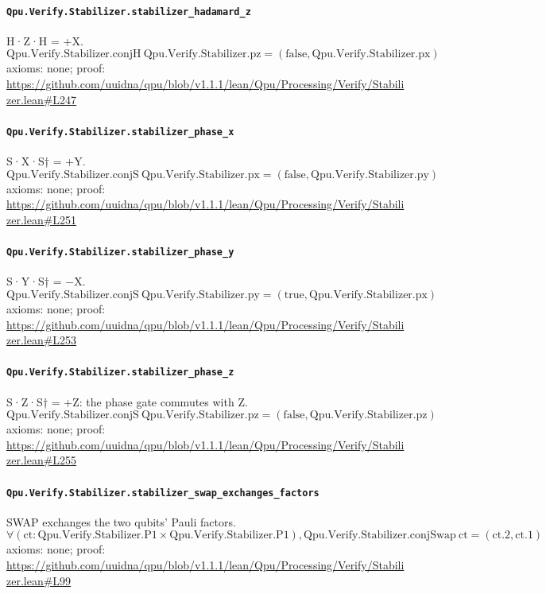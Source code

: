 \documentclass[11pt]{article}
\begin{document}
\paragraph{\texttt{Qpu.Verify.Stabilizer.stabilizer\_hadamard\_z}}
H·Z·H = +X.
\[ \mathrm{Qpu.Verify.Stabilizer.conjH}\ \mathrm{Qpu.Verify.Stabilizer.pz} = (\mathrm{false}, \mathrm{Qpu.Verify.Stabilizer.px}) \]
\noindent axioms: none; proof: \url{https://github.com/uuidna/qpu/blob/v1.1.1/lean/Qpu/Processing/Verify/Stabilizer.lean\#L247}

\paragraph{\texttt{Qpu.Verify.Stabilizer.stabilizer\_phase\_x}}
S·X·S† = +Y.
\[ \mathrm{Qpu.Verify.Stabilizer.conjS}\ \mathrm{Qpu.Verify.Stabilizer.px} = (\mathrm{false}, \mathrm{Qpu.Verify.Stabilizer.py}) \]
\noindent axioms: none; proof: \url{https://github.com/uuidna/qpu/blob/v1.1.1/lean/Qpu/Processing/Verify/Stabilizer.lean\#L251}

\paragraph{\texttt{Qpu.Verify.Stabilizer.stabilizer\_phase\_y}}
S·Y·S† = −X.
\[ \mathrm{Qpu.Verify.Stabilizer.conjS}\ \mathrm{Qpu.Verify.Stabilizer.py} = (\mathrm{true}, \mathrm{Qpu.Verify.Stabilizer.px}) \]
\noindent axioms: none; proof: \url{https://github.com/uuidna/qpu/blob/v1.1.1/lean/Qpu/Processing/Verify/Stabilizer.lean\#L253}

\paragraph{\texttt{Qpu.Verify.Stabilizer.stabilizer\_phase\_z}}
S·Z·S† = +Z: the phase gate commutes with Z.
\[ \mathrm{Qpu.Verify.Stabilizer.conjS}\ \mathrm{Qpu.Verify.Stabilizer.pz} = (\mathrm{false}, \mathrm{Qpu.Verify.Stabilizer.pz}) \]
\noindent axioms: none; proof: \url{https://github.com/uuidna/qpu/blob/v1.1.1/lean/Qpu/Processing/Verify/Stabilizer.lean\#L255}

\paragraph{\texttt{Qpu.Verify.Stabilizer.stabilizer\_swap\_exchanges\_factors}}
SWAP exchanges the two qubits' Pauli factors.
\[ \forall (\mathrm{ct} : \mathrm{Qpu.Verify.Stabilizer.P1} \times \mathrm{Qpu.Verify.Stabilizer.P1}), \mathrm{Qpu.Verify.Stabilizer.conjSwap}\ \mathrm{ct} = (\mathrm{ct.2}, \mathrm{ct.1}) \]
\noindent axioms: none; proof: \url{https://github.com/uuidna/qpu/blob/v1.1.1/lean/Qpu/Processing/Verify/Stabilizer.lean\#L99}
\end{document}
